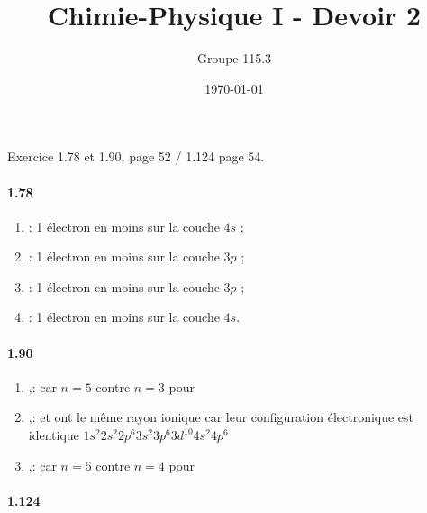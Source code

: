 \documentclass{article}
\title{Chimie-Physique I - Devoir 2}
\author{Groupe 115.3}
\date{\today}
\begin{document}
\maketitle

Exercice 1.78 et 1.90, page 52 / 1.124 page 54.

\paragraph{1.78}

\begin{enumerate}
  \item {} : 1 électron en moins sur la couche $4s$ ;
  \item {}: 1 électron en moins sur la couche $3p$ ;
  \item {}: 1 électron en moins sur la couche $3p$ ;
  \item {}: 1 électron en moins sur la couche $4s$.
\end{enumerate}

\paragraph{1.90}

\begin{enumerate}
	\item {},:  car $n = 5$ contre $n = 3$ pour  
	\item {},:  et  ont le même rayon ionique 
	car leur configuration électronique est identique $1s^2 2s^2 2p^6 3s^2 3p^6 3d^{10}4s^2 4p^6 $ 
	\item {},:  car $n = 5$ contre $n = 4$ pour  
\end{enumerate}

\paragraph{1.124}

\end{document}
